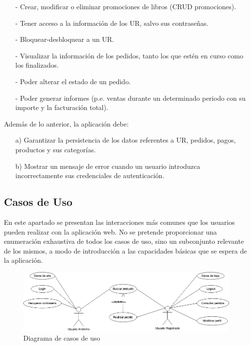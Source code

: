 \documentclass[a4paper]{article}
\begin{document}
\begin{enumerate}
\begin{itemize}
                    \item[-] Crear, modificar o eliminar promociones de libros (CRUD promociones).
                    \item[-] Tener acceso a la información de los UR, salvo sus contraseñas.
                    \item[-] Bloquear-desbloquear a un UR.
                    \item[-] Visualizar la información de los pedidos, tanto los que estén en curso como los finalizados.
                    \item[-] Poder alterar el estado de un pedido.
                    \item[-] Poder generar informes (p.e. ventas durante un determinado periodo con su importe y la facturación total).
                \end{itemize}
            \end{enumerate}

            Además de lo anterior, la aplicación debe:
            \begin{enumerate}
                \item[a)] Garantizar la persistencia de los datos referentes a UR, pedidos, pagos, productos y sus categorías.
                \item[b)] Mostrar un mensaje de error cuando un usuario introduzca incorrectamente sus credenciales de autenticación.
            \end{enumerate}

        \subsection{Casos de Uso}
            En este apartado se presentan las interacciones más comunes que los usuarios pueden realizar con la aplicación web. No se pretende proporcionar una enumeración exhaustiva de todos los casos de uso, sino un subconjunto relevante de los mismos, a modo de introducción a las capacidades básicas que se espera de la aplicación.

            \begin{figure}[htb!]
                \centering
                \includegraphics[width=\textwidth]{use-case_diagram}
                \caption{Diagrama de casos de uso}
                \label{fig:use-case_diagram}
            \end{figure}
\end{document}
